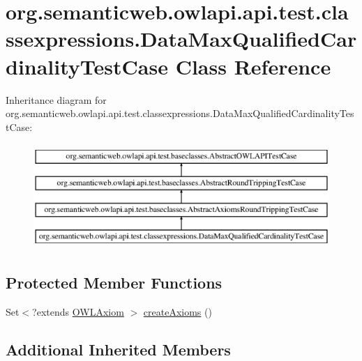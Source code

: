 \hypertarget{classorg_1_1semanticweb_1_1owlapi_1_1api_1_1test_1_1classexpressions_1_1_data_max_qualified_cardinality_test_case}{\section{org.\-semanticweb.\-owlapi.\-api.\-test.\-classexpressions.\-Data\-Max\-Qualified\-Cardinality\-Test\-Case Class Reference}
\label{classorg_1_1semanticweb_1_1owlapi_1_1api_1_1test_1_1classexpressions_1_1_data_max_qualified_cardinality_test_case}
}
Inheritance diagram for org.\-semanticweb.\-owlapi.\-api.\-test.\-classexpressions.\-Data\-Max\-Qualified\-Cardinality\-Test\-Case\-:\begin{figure}[H]
\begin{center}
\leavevmode
\includegraphics[height=4.000000cm]{classorg_1_1semanticweb_1_1owlapi_1_1api_1_1test_1_1classexpressions_1_1_data_max_qualified_cardinality_test_case}
\end{center}
\end{figure}
\subsection*{Protected Member Functions}
\begin{DoxyCompactItemize}
\item 
Set$<$?extends \hyperlink{interfaceorg_1_1semanticweb_1_1owlapi_1_1model_1_1_o_w_l_axiom}{O\-W\-L\-Axiom} $>$ \hyperlink{classorg_1_1semanticweb_1_1owlapi_1_1api_1_1test_1_1classexpressions_1_1_data_max_qualified_cardinality_test_case_af645cdd127da39631e9c941696c8a8c4}{create\-Axioms} ()
\end{DoxyCompactItemize}
\subsection*{Additional Inherited Members}


